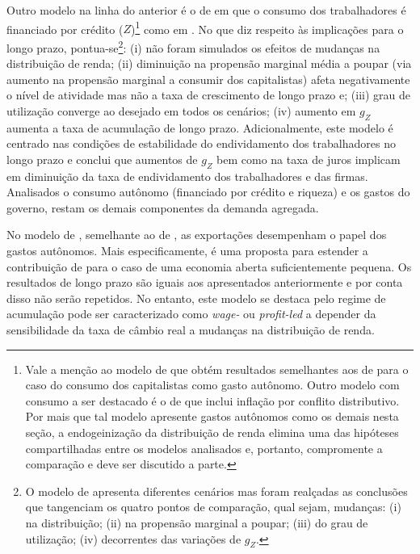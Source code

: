 
Outro modelo na linha do anterior é o de \textcite{mandarino_financing_2018} em que o consumo dos trabalhadores é financiado por crédito ($Z$)\footnote{
	Vale a menção ao modelo de \textcite{lavoie_convergence_2016} que obtém resultados semelhantes aos de \textcite{allain_macroeconomic_2014} para o caso do consumo dos capitalistas como gasto autônomo. Outro modelo com consumo a ser destacado é o de \textcite{nah_role_2019} %
	que inclui inflação por conflito distributivo. Por mais que tal modelo apresente gastos autônomos como os demais nesta seção, a endogeinização da distribuição de renda elimina uma das hipóteses compartilhadas entre os modelos analisados e, portanto, compromente a comparação e deve ser discutido a parte.
} como em \textcite{fagundes_dinamica_2017}. No que diz respeito às implicações para o longo prazo, pontua-se\footnote{
	O modelo de \textcite{mandarino_financing_2018} apresenta diferentes cenários mas foram realçadas as conclusões que tangenciam os quatro pontos de comparação, qual sejam, mudanças: (i) na distribuição; (ii) na propensão marginal a poupar; (iii) do grau de utilização; (iv) decorrentes das variações de $g_Z$.
}: 
	(i) não foram simulados os efeitos de mudanças na distribuição de renda; 
	(ii) diminuição na propensão marginal média a poupar (via aumento na propensão marginal a consumir dos capitalistas) afeta negativamente o nível de atividade mas não a taxa de crescimento de longo prazo e; 
	(iii) grau de utilização converge ao desejado em todos os cenários; 
	(iv) aumento em $g_Z$ aumenta a taxa de acumulação de longo prazo.
Adicionalmente, este modelo é centrado nas condições de estabilidade do endividamento dos trabalhadores no longo prazo e conclui que aumentos de $g_Z$ bem como na taxa de juros implicam em diminuição da taxa de endividamento dos trabalhadores e das firmas. Analisados o consumo autônomo (financiado por crédito e riqueza) e os gastos do governo, restam os demais componentes da demanda agregada.



No modelo de \textcite{nah_long-run_2017}, semelhante ao de \textcite{dejuan_hidden_2017}, as exportações desempenham o papel dos gastos autônomos. Mais especificamente, é uma proposta para estender a contribuição de \textcite{serrano_sraffian_1995} para o caso de uma economia aberta suficientemente pequena. Os resultados de longo prazo são iguais aos apresentados anteriormente e por conta disso não serão repetidos. No entanto, este modelo se destaca pelo regime de acumulação pode ser caracterizado como \textit{wage-} ou \textit{profit-led} a depender da sensibilidade da taxa de câmbio real a mudanças na distribuição de renda. 

